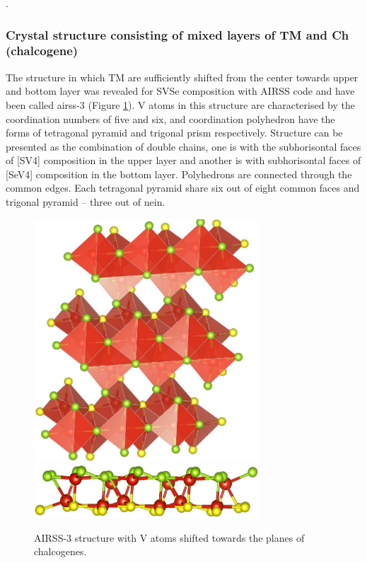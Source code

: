 .\documentclass[a4paperm]{article}
\begin{document}
\subsubsection{Crystal structure consisting of mixed layers of TM and Ch (chalcogene)}

The structure in which TM are sufficiently shifted from the center towards upper and bottom layer was revealed for SVSe composition with AIRSS code and have been called airss-3 (Figure \ref{airss-3}).
V atoms in this structure are characterised by the coordination numbers of five and six, and coordination polyhedron have the forms of tetragonal pyramid and trigonal prism respectively.
Structure can be presented as the combination of double chains, one is with the subhorisontal faces of [SV4] composition in the upper layer and another is with subhorisontal faces of [SeV4] composition in the bottom layer.
Polyhedrons are connected through the common edges.
Each tetragonal pyramid share six out of eight common faces and trigonal pyramid – three out of nein.

\begin{figure}[H]
        \includegraphics[width=0.75\textwidth]{airss-3-1.jpg} \\ \vspace{3mm}
        \includegraphics[width=0.75\textwidth]{airss-3-2.jpg}
        \caption{AIRSS-3 structure with V atoms shifted towards the planes of chalcogenes.}
\label{airss-3}
\end{figure}
\end{document}
